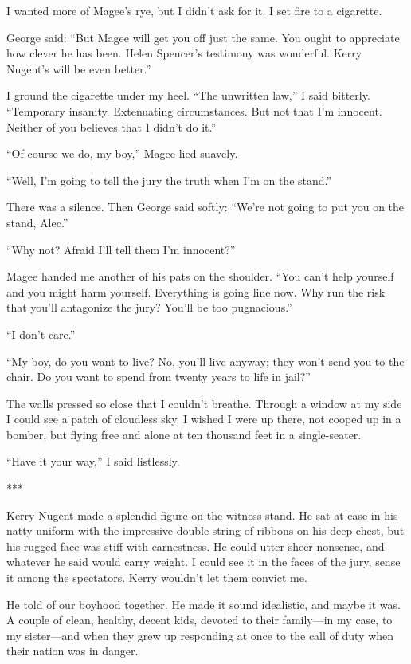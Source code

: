 \documentclass{novel}
\begin{document}
I wanted more of Magee’s rye, but I didn’t ask for it. I set fire to a cigarette.

George said: “But Magee will get you off just the same. You ought to appreciate how clever he has been. Helen Spencer’s testimony was wonderful. Kerry Nugent’s will be even better.”

I ground the cigarette under my heel. “The unwritten law,” I said bitterly. “Temporary insanity. Extenuating circumstances. But not that I’m innocent. Neither of you believes that I didn’t do it.”

“Of course we do, my boy,” Magee lied suavely.

“Well, I’m going to tell the jury the truth when I’m on the stand.”

There was a silence. Then George said softly: “We’re not going to put you on the stand, Alec.”

“Why not? Afraid I’ll tell them I’m innocent?”

Magee handed me another of his pats on the shoulder. “You can’t help yourself and you might harm yourself. Everything is going line now. Why run the risk that you’ll antagonize the jury? You’ll be too pugnacious.”

“I don’t care.”

“My boy, do you want to live? No, you’ll live anyway; they won’t send you to the chair. Do you want to spend from twenty years to life in jail?”

The walls pressed so close that I couldn’t breathe. Through a window at my side I could see a patch of cloudless sky. I wished I were up there, not cooped up in a bomber, but flying free and alone at ten thousand feet in a single-seater.

“Have it your way,” I said listlessly.

***

Kerry Nugent made a splendid figure on the witness stand. He sat at ease in his natty uniform with the impressive double string of ribbons on his deep chest, but his rugged face was stiff with earnestness. He could utter sheer nonsense, and whatever he said would carry weight. I could see it in the faces of the jury, sense it among the spectators. Kerry wouldn’t let them convict me.

He told of our boyhood together. He made it sound idealistic, and maybe it was. A couple of clean, healthy, decent kids, devoted to their family—in my case, to my sister—and when they grew up responding at once to the call of duty when their nation was in danger.
\end{document}
